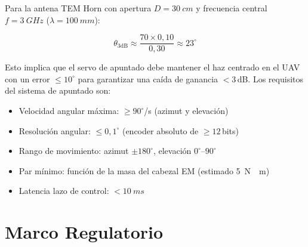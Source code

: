 \documentclass[12pt,a4paper]{article}
\begin{document}
Para la antena TEM Horn con apertura $D = \SI{30}{cm}$
y frecuencia central $f = \SI{3}{GHz}$ ($\lambda = \SI{100}{mm}$):

\begin{equation}
  \theta_{3\mathrm{dB}} \approx \frac{70 \times 0{,}10}{0{,}30} \approx 23^{\circ}
\end{equation}

Esto implica que el servo de apuntado debe mantener el haz centrado
en el UAV con un error $\leq 10^{\circ}$ para garantizar una caída de ganancia
$< 3$\,dB. Los requisitos del sistema de apuntado son:

\begin{itemize}[noitemsep]
  \item Velocidad angular máxima: $\geq 90^{\circ}$/s (azimut y elevación)
  \item Resolución angular: $\leq 0{,}1^{\circ}$ (encoder absoluto de $\geq 12$\,bits)
  \item Rango de movimiento: azimut $\pm 180^{\circ}$, elevación $0^{\circ}$–$90^{\circ}$
  \item Par mínimo: función de la masa del cabezal EM (estimado \SI{5}{N\cdot m})
  \item Latencia lazo de control: $< \SI{10}{ms}$
\end{itemize}

\newpage

\section{Marco Regulatorio}
\end{document}
